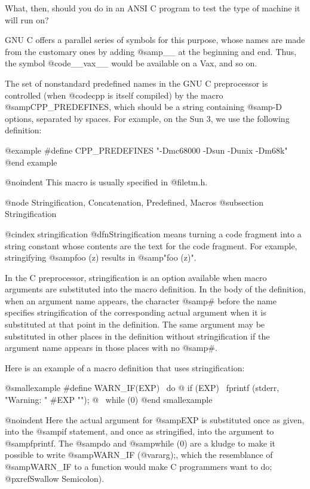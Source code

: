 {What, then, should you do in an ANSI C program to test the type of machine
it will run on?

GNU C offers a parallel series of symbols for this purpose, whose names
are made from the customary ones by adding @samp{__} at the beginning
and end.  Thus, the symbol @code{__vax__} would be available on a Vax,
and so on.

The set of nonstandard predefined names in the GNU C preprocessor is
controlled (when @code{cpp} is itself compiled) by the macro
@samp{CPP_PREDEFINES}, which should be a string containing @samp{-D}
options, separated by spaces.  For example, on the Sun 3, we use the
following definition:

@example
#define CPP_PREDEFINES "-Dmc68000 -Dsun -Dunix -Dm68k"
@end example

@noindent 
This macro is usually specified in @file{tm.h}.

@node Stringification, Concatenation, Predefined, Macros
@subsection Stringification

@cindex stringification
@dfn{Stringification} means turning a code fragment into a string constant
whose contents are the text for the code fragment.  For example,
stringifying @samp{foo (z)} results in @samp{"foo (z)"}.

In the C preprocessor, stringification is an option available when macro
arguments are substituted into the macro definition.  In the body of the
definition, when an argument name appears, the character @samp{#} before
the name specifies stringification of the corresponding actual argument
when it is substituted at that point in the definition.  The same argument
may be substituted in other places in the definition without
stringification if the argument name appears in those places with no
@samp{#}.

Here is an example of a macro definition that uses stringification:

@smallexample
#define WARN_IF(EXP) \
do @{ if (EXP) \
        fprintf (stderr, "Warning: " #EXP "\n"); @} \
while (0)
@end smallexample

@noindent
Here the actual argument for @samp{EXP} is substituted once as given,
into the @samp{if} statement, and once as stringified, into the
argument to @samp{fprintf}.  The @samp{do} and @samp{while (0)} are
a kludge to make it possible to write @samp{WARN_IF (@var{arg});},
which the resemblance of @samp{WARN_IF} to a function would make
C programmers want to do; @pxref{Swallow Semicolon}).

}
